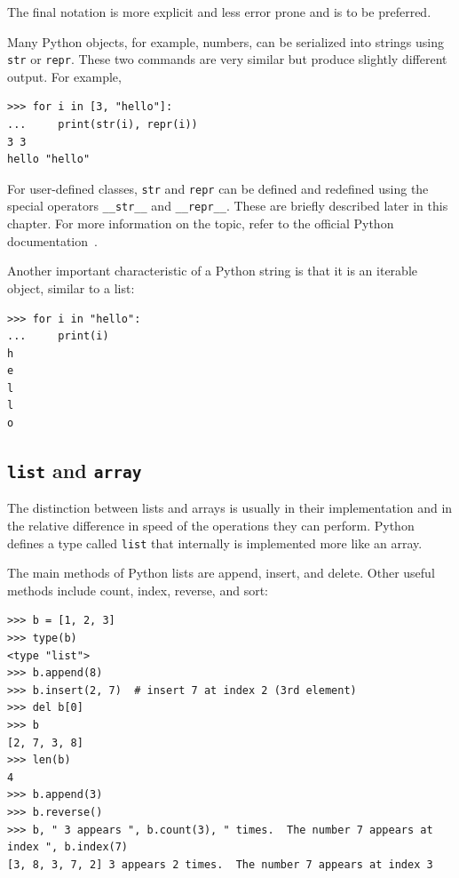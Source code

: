 \documentclass[justified, sixbynine]{tufte-book}
\def\ft{\small\tt}
\theoremstyle{plain}%
\newtheorem * {corollary}{Corollary}
\theoremstyle{definition}
\theoremstyle{remark}
\newtheorem * {remark}{Remark}
\newtheorem * {note}{Note}
\begin{document}
\begin{fullwidth}
The final notation is more explicit and less error prone and is to be preferred.

Many Python objects, for example, numbers, can be serialized into strings using {\ft str} or {\ft repr}. These two commands are very similar but produce slightly different output. For example, 

\begin{lstlisting}
>>> for i in [3, "hello"]:
...     print(str(i), repr(i))
3 3
hello "hello"
\end{lstlisting}

For user-defined classes, {\ft str} and {\ft repr} can be defined and redefined using the special operators {\ft \_\_str\_\_} and {\ft \_\_repr\_\_}. These are briefly described later in this chapter. For more information on the topic, refer to the official Python documentation~\cite{pydocs}.

Another important characteristic of a Python string is that it is an iterable object, similar to a list:

\begin{lstlisting}
>>> for i in "hello":
...     print(i)
h
e
l
l
o
\end{lstlisting}

\goodbreak\subsection{{\ft list} and {\ft array}}


The distinction between lists and arrays is usually in their implementation and in the relative difference in speed of the operations they can perform. Python defines a type called {\ft list} that internally is implemented more like an array.

The main methods of Python lists are append, insert, and delete.  Other useful methods include count, index, reverse, and sort:

\begin{lstlisting}
>>> b = [1, 2, 3]
>>> type(b)
<type "list">
>>> b.append(8)
>>> b.insert(2, 7)  # insert 7 at index 2 (3rd element)
>>> del b[0]
>>> b
[2, 7, 3, 8]
>>> len(b)
4
>>> b.append(3)
>>> b.reverse()
>>> b, " 3 appears ", b.count(3), " times.  The number 7 appears at index ", b.index(7)
[3, 8, 3, 7, 2] 3 appears 2 times.  The number 7 appears at index 3

\end{lstlisting}


\end{fullwidth}
\end{document}
